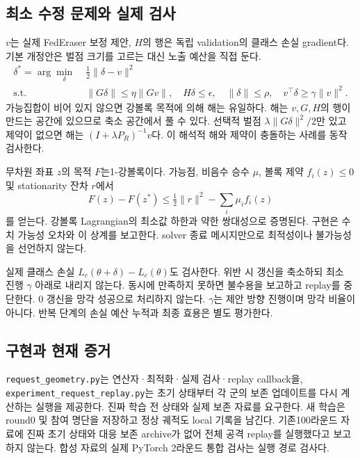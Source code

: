 \documentclass[10pt,a4paper]{article}
\begin{document}
\subsection{최소 수정 문제와 실제 검사}
$v$는 실제 FedEraser 보정 제안, $H$의 행은 독립 validation의 클래스 손실 gradient다.
기본 개정안은 벌점 크기를 고르는 대신 노출 예산을 직접 둔다.
\begin{equation}
\begin{aligned}
\delta^*=\arg\min_\delta\;&\tfrac12\|\delta-v\|^2\\
\text{s.t. }\;&\|G\delta\|\le\eta\|Gv\|,\quad H\delta\le\epsilon,\quad
\|\delta\|\le\rho,\quad v^\top\delta\ge\gamma\|v\|^2 .
\end{aligned}
\end{equation}
가능집합이 비어 있지 않으면 강볼록 목적에 의해 해는 유일하다.
해는 $v,G,H$의 행이 만드는 공간에 있으므로 축소 공간에서 풀 수 있다.
선택적 벌점 $\lambda\|G\delta\|^2/2$만 있고 제약이 없으면 해는
$(I+\lambda P_R)^{-1}v$다. 이 해석적 해와 제약이 충돌하는 사례를 동작 검사한다.

무차원 좌표 $z$의 목적 $F$는1-강볼록이다. 가능점, 비음수 승수 $\mu$,
볼록 제약 $f_i(z)\le0$ 및 stationarity 잔차 $r$에서
\begin{equation}
F(z)-F(z^*)\le\tfrac12\|r\|^2-\sum_i\mu_i f_i(z)
\end{equation}
를 얻는다. 강볼록 Lagrangian의 최소값 하한과 약한 쌍대성으로 증명된다.
구현은 수치 가능성 오차와 이 상계를 보고한다. solver 종료 메시지만으로
최적성이나 불가능성을 선언하지 않는다.

실제 클래스 손실 $L_c(\theta+\delta)-L_c(\theta)$도 검사한다.
위반 시 갱신을 축소하되 최소 진행 $\gamma$ 아래로 내리지 않는다.
동시에 만족하지 못하면 불수용을 보고하고 replay를 중단한다.
0 갱신을 망각 성공으로 처리하지 않는다. $\gamma$는 제안 방향 진행이며
망각 비율이 아니다. 반복 단계의 손실 예산 누적과 최종 효용은 별도 평가한다.

\subsection{구현과 현재 증거}
\texttt{request\_geometry.py}는 연산자·최적화·실제 검사·replay callback을,
\texttt{experiment\_request\_replay.py}는 초기 상태부터 각 군의 보존 업데이트를
다시 계산하는 실행을 제공한다. 진짜 학습 전 상태와 실제 보존 자료를 요구한다.
새 학습은 round0 및 참여 명단을 저장하고 정상 궤적도 local 기록을 남긴다.
기존100라운드 자료에 진짜 초기 상태와 대응 보존 archive가 없어
전체 공격 replay를 실행했다고 보고하지 않는다. 합성 자료의 실제 PyTorch
2라운드 통합 검사는 실행 경로 검사다.
\end{document}
